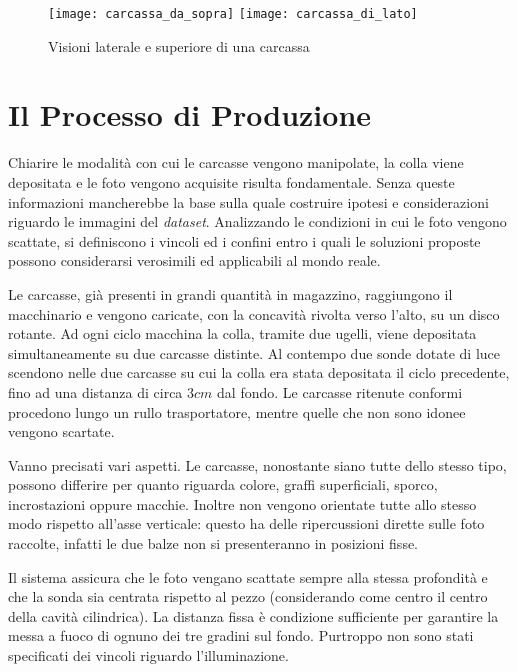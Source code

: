 \begin{figure}[h]
  \texttt{[image: carcassa\_da\_sopra]}
  \texttt{[image: carcassa\_di\_lato]}
  \caption{Visioni laterale e superiore di una carcassa}
  \label{fig:carc}
\end{figure}

\clearpage

\section{Il Processo di Produzione}
Chiarire le modalità con cui le carcasse vengono manipolate, la colla viene depositata e le foto vengono acquisite risulta fondamentale.
Senza queste informazioni mancherebbe la base sulla quale costruire ipotesi e considerazioni riguardo le immagini del \textit{dataset}.
Analizzando le condizioni in cui le foto vengono scattate, si definiscono i vincoli ed i confini entro i quali le soluzioni proposte possono considerarsi verosimili ed applicabili al mondo reale.

Le carcasse, già presenti in grandi quantità in magazzino, raggiungono il macchinario e vengono caricate, con la concavità rivolta verso l'alto, su un disco rotante.
Ad ogni ciclo macchina la colla, tramite due ugelli, viene depositata simultaneamente su due carcasse distinte.
Al contempo due sonde dotate di luce scendono nelle due carcasse su cui la colla era stata depositata il ciclo precedente, fino ad una distanza di circa $3cm$ dal fondo.
Le carcasse ritenute conformi procedono lungo un rullo trasportatore, mentre quelle che non sono idonee vengono scartate.

Vanno precisati vari aspetti.
Le carcasse, nonostante siano tutte dello stesso tipo, possono differire per quanto riguarda colore, graffi superficiali, sporco, incrostazioni oppure macchie.
Inoltre non vengono orientate tutte allo stesso modo rispetto all'asse verticale: questo ha delle ripercussioni dirette sulle foto raccolte, infatti le due balze non si presenteranno in posizioni fisse.

Il sistema assicura che le foto vengano scattate sempre alla stessa profondità e che la sonda sia centrata rispetto al pezzo (considerando come centro il centro della cavità cilindrica).
La distanza fissa è condizione sufficiente per garantire la messa a fuoco di ognuno dei tre gradini sul fondo.
Purtroppo non sono stati specificati dei vincoli riguardo l'illuminazione.

